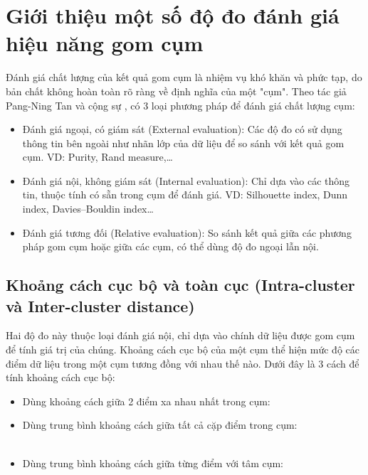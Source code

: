 \section{Giới thiệu một số độ đo đánh giá hiệu năng gom cụm} \label{clusterEvalMetrics}
Đánh giá chất lượng của kết quả gom cụm là nhiệm vụ khó khăn và phức tạp, do bản chất không hoàn toàn rõ ràng về định nghĩa của một "cụm". Theo tác giả Pang-Ning Tan và cộng sự \cite{IntroToDM}, có 3 loại phương pháp để đánh giá chất lượng cụm: 
	\begin{itemize}
		\item Đánh giá ngoại, có giám sát (External evaluation): Các độ đo có sử dụng thông tin bên ngoài như nhãn lớp của dữ liệu để so sánh với kết quả gom cụm.
		VD: Purity, Rand measure,…
		\item Đánh giá nội, không giám sát (Internal evaluation): Chỉ dựa vào các thông tin, thuộc tính có sẵn trong cụm để đánh giá.
		VD: Silhouette index, Dunn index, Davies–Bouldin index…
		\item Đánh giá tương đối (Relative evaluation): So sánh kết quả giữa các phương pháp gom cụm hoặc giữa các cụm, có thể dùng độ đo ngoại lẫn nội.
	\end{itemize}

	\subsection{Khoảng cách cục bộ và toàn cục (Intra-cluster và Inter-cluster distance)} \label{localglobaldistance}
	Hai độ đo này thuộc loại đánh giá nội, chỉ dựa vào chính dữ liệu được gom cụm để tính giá trị của chúng. Khoảng cách cục bộ của một cụm thể hiện mức độ các điểm dữ liệu trong một cụm tương đồng với nhau thế nào. Dưới đây là 3 cách để tính khoảng cách cục bộ:
		\begin{itemize}
			\item Dùng khoảng cách giữa 2 điểm xa nhau nhất trong cụm:\\
			
			\item Dùng trung bình khoảng cách giữa tất cả cặp điểm trong cụm:\\
			\\
			
			\item Dùng trung bình khoảng cách giữa từng điểm với tâm cụm:\\
			\\	
		\end{itemize}
	
